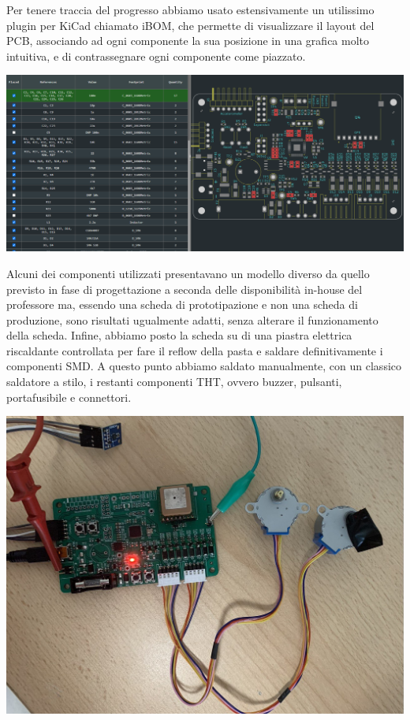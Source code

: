 \noindent Per tenere traccia del progresso abbiamo usato estensivamente un utilissimo plugin per KiCad chiamato iBOM, che permette di visualizzare il layout del PCB, associando ad ogni componente la sua posizione in una grafica molto intuitiva, e di contrassegnare ogni componente come piazzato.

\begin{center}
    \includegraphics[width=\textwidth]{figures/image108.png}
    \captionsetup{type=figure}
\end{center}

\noindent Alcuni dei componenti utilizzati presentavano un modello diverso da quello previsto in fase di progettazione a seconda delle disponibilità in-house del professore ma, essendo una scheda di prototipazione e non una scheda di produzione, sono risultati ugualmente adatti, senza alterare il funzionamento della scheda. Infine, abbiamo posto la scheda su di una piastra elettrica riscaldante controllata per fare il reflow della pasta e saldare definitivamente i componenti SMD. A questo punto abbiamo saldato manualmente, con un classico saldatore a stilo, i restanti componenti THT, ovvero buzzer, pulsanti, portafusibile e connettori.

\begin{center}
\includegraphics[scale=0.30]{figures/image101.png}
\captionsetup{type=figure}
\end{center}

